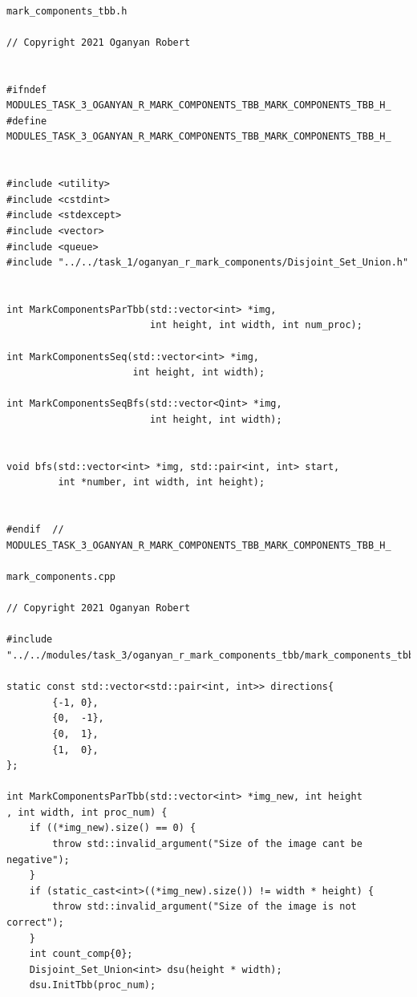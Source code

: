 \documentclass{report}
\begin{document}
\begin{lstlisting}

mark_components_tbb.h

// Copyright 2021 Oganyan Robert


#ifndef MODULES_TASK_3_OGANYAN_R_MARK_COMPONENTS_TBB_MARK_COMPONENTS_TBB_H_
#define MODULES_TASK_3_OGANYAN_R_MARK_COMPONENTS_TBB_MARK_COMPONENTS_TBB_H_


#include <utility>
#include <cstdint>
#include <stdexcept>
#include <vector>
#include <queue>
#include "../../task_1/oganyan_r_mark_components/Disjoint_Set_Union.h"


int MarkComponentsParTbb(std::vector<int> *img,
                         int height, int width, int num_proc);

int MarkComponentsSeq(std::vector<int> *img,
                      int height, int width);

int MarkComponentsSeqBfs(std::vector<Qint> *img,
                         int height, int width);


void bfs(std::vector<int> *img, std::pair<int, int> start,
         int *number, int width, int height);


#endif  //  MODULES_TASK_3_OGANYAN_R_MARK_COMPONENTS_TBB_MARK_COMPONENTS_TBB_H_

mark_components.cpp

// Copyright 2021 Oganyan Robert

#include "../../modules/task_3/oganyan_r_mark_components_tbb/mark_components_tbb.h"

static const std::vector<std::pair<int, int>> directions{
        {-1, 0},
        {0,  -1},
        {0,  1},
        {1,  0},
};

int MarkComponentsParTbb(std::vector<int> *img_new, int height
, int width, int proc_num) {
    if ((*img_new).size() == 0) {
        throw std::invalid_argument("Size of the image cant be negative");
    }
    if (static_cast<int>((*img_new).size()) != width * height) {
        throw std::invalid_argument("Size of the image is not correct");
    }
    int count_comp{0};
    Disjoint_Set_Union<int> dsu(height * width);
    dsu.InitTbb(proc_num);


\end{lstlisting}
\end{document}
